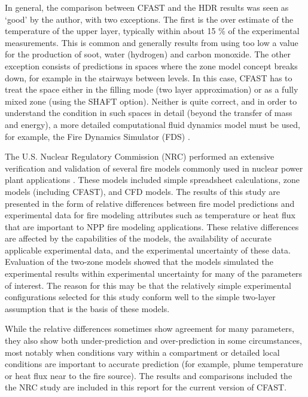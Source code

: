 In general, the comparison between CFAST and the HDR results was seen as `good' by the author, with two exceptions. The first is the over estimate of the temperature of the upper layer, typically within about 15 \% of the experimental measurements. This is common and generally results from using too low a value for the production of soot, water (hydrogen) and carbon monoxide. The other exception consists of predictions in spaces where the zone model concept breaks down, for example in the stairways between levels. In this case, CFAST has to treat the space either in the filling mode (two layer approximation) or as a fully mixed zone (using the SHAFT option). Neither is quite correct, and in order to understand the condition in such spaces in detail (beyond the transfer of mass and energy), a more detailed computational fluid dynamics model must be used, for example,  the Fire Dynamics Simulator (FDS) \cite{FDS_Tech_Guide_5}.

The U.S. Nuclear Regulatory Commission (NRC) performed an extensive verification and validation of several fire models commonly used in nuclear power plant applications \cite{NRCNUREG1824}.  These models included simple spreadsheet calculations, zone models (including CFAST), and CFD models. The results of this study are presented in the form of relative differences between fire model predictions and experimental data for fire modeling attributes such as temperature or heat flux that are important to NPP fire modeling applications.  These relative differences are affected by the capabilities of the models, the availability of accurate applicable experimental data, and the experimental uncertainty of these data. Evaluation of the two-zone models showed that the models simulated the experimental results within experimental uncertainty  for many of the parameters of interest. The reason for this may be that the relatively simple experimental configurations selected for this study conform well to the simple two-layer assumption that is the basis of these models.

While the relative differences sometimes show agreement for many parameters, they also show both under-prediction and over-prediction in some circumstances, most notably when conditions vary within a compartment or detailed local conditions are important to accurate prediction (for example, plume temperature or heat flux near to the fire source). The results and comparisons included the the NRC study are included in this report for the current version of CFAST.

